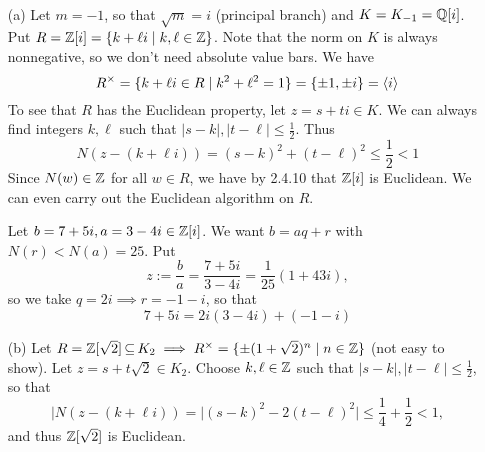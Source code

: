 \documentclass[11pt]{book}
\theoremstyle{definition}   \newtheorem{defn}[counter]{Definition} %
\newcommand{\gen}[1]{\langle #1 \rangle}   \newcommand{\stab}[2]{\tn{Stab}_{#1}(#2)}   \newcommand{\fix}[2]{\tn{Fix}_{#1}(#2)}
\newcommand{\vs}{\vspace{8pt}}
\numberwithin{counter}{chapter}
\begin{document}
\begin{example*}[Applications]
\
\begin{enumerate}
\item[(a)] Let $m=-1$, so that $\sqrt{m} = i$ (principal branch) and $K = K_{-1} = \operatorname{\mathbb{Q}}[i]$. Put $R = \operatorname{\mathbb{Z}}[i] = \{k+\ell i \mid k,\ell \in \operatorname{\mathbb{Z}}\}$. Note that the norm on $K$ is always nonnegative, so we don't need absolute value bars. We have
	\[R\x = \{k + \ell i \in R \mid k^2+\ell^2 = 1\} = \{\pm 1,\pm i\} =\gen{i}\]
To see that $R$ has the Euclidean property, let $z = s + ti \in K$. We can always find integers $k,\ell$ such that $|s-k|,|t-\ell| \leq \frac{1}{2}$. Thus
	\[N(z-(k+\ell i)) = (s-k)^2+(t-\ell)^2 \leq \frac{1}{2} < 1 \]
Since $N(w) \in \operatorname{\mathbb{Z}}$ for all $w \in R$, we have by 2.4.10 that $\operatorname{\mathbb{Z}}[i]$ is Euclidean. We can even carry out the Euclidean algorithm on $R$.
\begin{example*}
Let $b = 7+5i,a=3-4i \in \operatorname{\mathbb{Z}}[i]$. We want $b = aq+r$ with $N(r) < N(a) = 25$. Put
	\[z := \frac{b}{a} = \frac{7+5i}{3-4i} = \frac{1}{25} (1+43i), \]
so we take $q = 2i \implies r = -1-i$, so that
	\[7+5i = 2i(3-4i) + (-1-i) \]
\end{example*}

\item[(b)]Let $R = \operatorname{\mathbb{Z}}[\sqrt{2}] \operatorname{\subseteq} K_2 \implies R^{\times} = \{\pm(1+\sqrt{2})^n \mid n \in \operatorname{\mathbb{Z}}\}$ (not easy to show). Let $z = s + t\sqrt{2} \in K_2$. Choose $k,\ell \in \operatorname{\mathbb{Z}}$ such that $|s-k|,|t-\ell|\leq \frac{1}{2}$, so that
\[|N(z-(k+\ell i)) = |(s-k)^2-2(t-\ell)^2| \leq \frac{1}{4} + \frac{1}{2} < 1, \]
and thus $\operatorname{\mathbb{Z}}[\sqrt{2}]$ is Euclidean.
\end{enumerate}
\end{example*}

\vs
\end{document}
